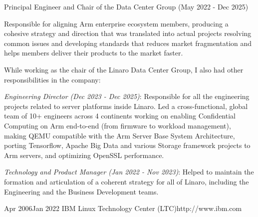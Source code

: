 \documentclass[10pt]{article} %
\begin{document}
\job
{Principal Engineer and Chair of the Data Center Group (May 2022 - Dec 2025)}
{

Responsible for aligning Arm enterprise ecosystem members, producing a cohesive strategy and direction that was translated into actual projects resolving common issues and developing standards that reduces market fragmentation and helps members deliver their products to the market faster.

\medskip

While working as the chair of the Linaro Data Center Group, I also had other responsibilities in the company:

\begin{itemize-noindent}

\item{\textit{Engineering Director (Dec 2023 - Dec 2025)}: Responsible for all the engineering projects related to server platforms inside Linaro. Led a cross-functional, global team of 10+ engineers across 4 continents working on enabling Confidential Computing on Arm end-to-end (from firmware to workload management), making QEMU compatible with the Arm Server Base System Architecture, porting Tensorflow, Apache Big Data and various Storage framework projects to Arm servers, and optimizing OpenSSL performance.}

\item{\textit{Technology and Product Manager (Jan 2022 - Nov 2023)}: Helped to maintain the formation and articulation of a coherent strategy for all of Linaro, including the Engineering and the Business Development teams.}

\end{itemize-noindent}

}

\pagebreak[3]

\employer
{Apr 2006}{Jan 2022}
{IBM Linux Technology Center (LTC)}{http://www.ibm.com}
\end{document}
